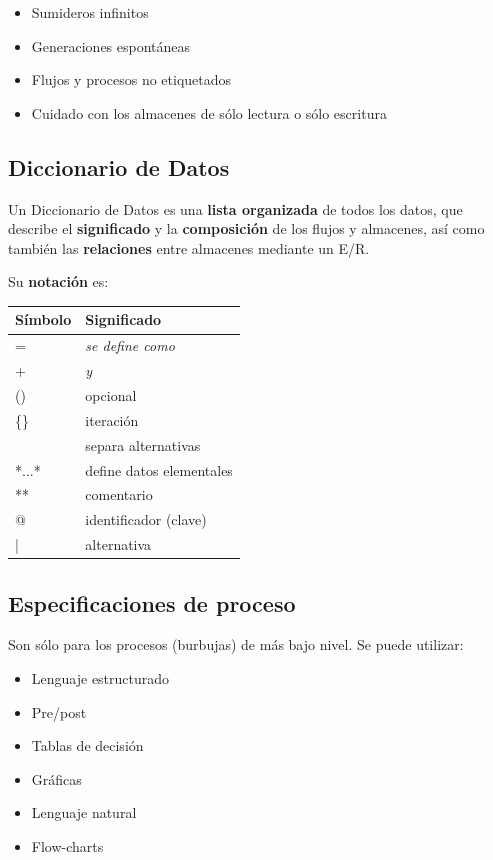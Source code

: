 \begin{itemize}[noitemsep]
\item Sumideros infinitos
\item Generaciones espontáneas
\item Flujos y procesos no etiquetados
\item Cuidado con los almacenes de sólo lectura o sólo escritura
\end{itemize}


\subsection{Diccionario de Datos} %
Un Diccionario de Datos es una \textbf{lista organizada} de todos los datos, que describe el \textbf{significado} y la \textbf{composición} de los flujos y almacenes, así como también las \textbf{relaciones} entre almacenes mediante un E/R.

Su \textbf{notación} es:

\begin{center}
  \begin{tabular}[h]{ l | l }
    \textbf{Símbolo}   & \textbf{Significado} \\
    \hline
    =                  & \textit{se define como} \\
    +                  & \textit{y} \\
    ()                 & opcional \\
    \{\}               & iteración \\
    \big[\big]         & separa alternativas \\
    *...*              & define datos elementales \\
    **                 & comentario \\
    @                  & identificador (clave) \\
    |                  & alternativa \\
  \end{tabular}
\end{center}

\subsection{Especificaciones de proceso}

Son sólo para los procesos (burbujas) de más bajo nivel. Se puede utilizar:

\begin{itemize}[noitemsep]
\item Lenguaje estructurado
\item Pre/post
\item Tablas de decisión
\item Gráficas
\item Lenguaje natural
\item Flow-charts
\end{itemize}

